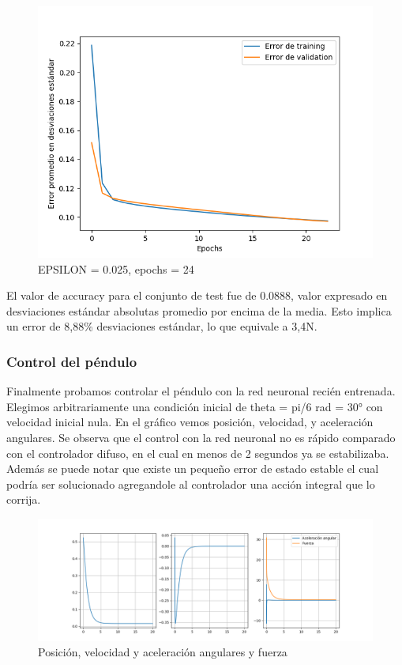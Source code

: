 \documentclass[
]{article}
\begin{document}
\begin{figure}
\centering
\includegraphics{mlp_imgs/pendulum_epochsfixed_eps0025.png}
\caption{EPSILON = 0.025, epochs = 24}
\end{figure}

El valor de accuracy para el conjunto de test fue de 0.0888, valor
expresado en desviaciones estándar absolutas promedio por encima de la
media. Esto implica un error de 8,88\% desviaciones estándar, lo que
equivale a 3,4N.

\hypertarget{control-del-puxe9ndulo}{%
\subsubsection{Control del péndulo}\label{control-del-puxe9ndulo}}

Finalmente probamos controlar el péndulo con la red neuronal recién
entrenada. Elegimos arbitrariamente una condición inicial de theta =
pi/6 rad = 30° con velocidad inicial nula. En el gráfico vemos posición,
velocidad, y aceleración angulares. Se observa que el control con la red
neuronal no es rápido comparado con el controlador difuso, en el cual en
menos de 2 segundos ya se estabilizaba. Además se puede notar que existe
un pequeño error de estado estable el cual podría ser solucionado
agregandole al controlador una acción integral que lo corrija.

\begin{figure}
\centering
\includegraphics{mlp_imgs/control_pendulo_mlp.png}
\caption{Posición, velocidad y aceleración angulares y fuerza}
\end{figure}
\end{document}
